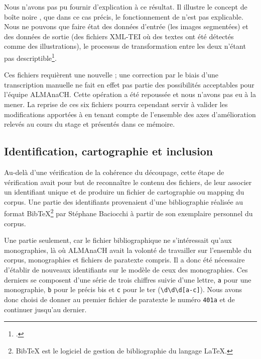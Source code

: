 Nous n'avons pas pu fournir d'explication à ce résultat. Il illustre le concept de \og boîte noire \fg, \cad{} que dans ce cas précis, le fonctionnement de \lse{} n'est pas explicable. Nous ne pouvons que faire état des données d'entrée (les images segmentées) et des données de sortie (des fichiers XML-TEI où des textes ont été détectés comme des illustrations), le processus de transformation entre les deux n'étant pas descriptible\footcite[p. 4]{henin}.

Ces fichiers requièrent une nouvelle \ocr{} ; une correction par le biais d'une transcription manuelle ne fait en effet pas partie des possibilités acceptables pour l'équipe ALMAnaCH. Cette opération a été repoussée et nous n'avons pas eu à la mener. La reprise de ces six fichiers pourra cependant servir à valider les modifications apportées à \lse{} en tenant compte de l'ensemble des axes d'amélioration relevés au cours du stage et présentés dans ce mémoire.

\subsection{Identification, cartographie et inclusion}

Au-delà d'une vérification de la cohérence du découpage, cette étape de vérification avait pour but de reconnaître le contenu des fichiers, de leur associer un identifiant unique et de produire un fichier de cartographie ou \og mapping \fg{} du corpus. Une partie des identifiants provenaient d'une bibliographie réalisée au format BibTeX\footnote{BibTeX est le logiciel de gestion de bibliographie du langage \LaTeX.} par Stéphane Baciocchi à partir de son exemplaire personnel du corpus.

Une partie seulement, car le fichier bibliographique ne s'intéressait qu'aux monographies, là où ALMAnaCH avait la volonté de travailler sur l'ensemble du corpus, monographies et fichiers de paratexte compris. Il a donc été nécessaire d'établir de nouveaux identifiants sur le modèle de ceux des monographies. Ces derniers se composent d'une série de trois chiffres suivie d'une lettre, \texttt{a} pour une monographie, \texttt{b} pour le précis bis et \texttt{c} pour le ter (\texttt{\textbackslash d\textbackslash d\textbackslash d[a-c]}). Nous avons donc choisi de donner au premier fichier de paratexte le numéro \texttt{401a} et de continuer jusqu'au dernier.

